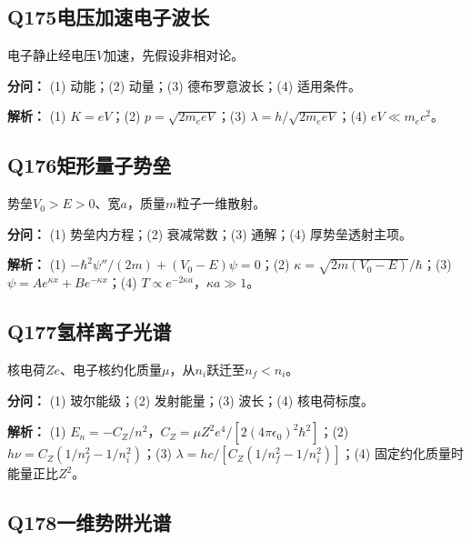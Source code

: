 \medskip

\subsection*{Q175\quad 电压加速电子波长}

电子静止经电压$V$加速，先假设非相对论。

\par\textbf{分问：} (1) 动能；(2) 动量；(3) 德布罗意波长；(4) 适用条件。

\par\textbf{解析：} (1) $K=eV$；(2) $p=\sqrt{2m_eeV}$；(3) $\lambda=h/\sqrt{2m_eeV}$；(4) $eV\ll m_ec^2$。

\medskip

\subsection*{Q176\quad 矩形量子势垒}

势垒$V_0>E>0$、宽$a$，质量$m$粒子一维散射。

\par\textbf{分问：} (1) 势垒内方程；(2) 衰减常数；(3) 通解；(4) 厚势垒透射主项。

\par\textbf{解析：} (1) $-\hbar^2\psi''/(2m)+(V_0-E)\psi=0$；(2) $\kappa=\sqrt{2m(V_0-E)}/\hbar$；(3) $\psi=Ae^{\kappa x}+Be^{-\kappa x}$；(4) $T\propto e^{-2\kappa a}$，$\kappa a\gg1$。

\medskip

\subsection*{Q177\quad 氢样离子光谱}

核电荷$Ze$、电子核约化质量$\mu$，从$n_i$跃迁至$n_f<n_i$。

\par\textbf{分问：} (1) 玻尔能级；(2) 发射能量；(3) 波长；(4) 核电荷标度。

\par\textbf{解析：} (1) $E_n=-C_Z/n^2$，$C_Z=\mu Z^2e^4/[2(4\pi\epsilon_0)^2\hbar^2]$；(2) $h\nu=C_Z(1/n_f^2-1/n_i^2)$；(3) $\lambda=hc/[C_Z(1/n_f^2-1/n_i^2)]$；(4) 固定约化质量时能量正比$Z^2$。

\medskip

\subsection*{Q178\quad 一维势阱光谱}

